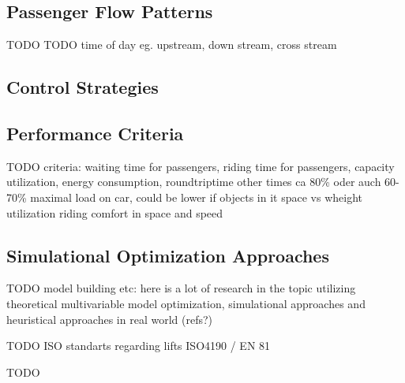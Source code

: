 \subsection{Passenger Flow Patterns}
TODO
TODO time of day eg. upstream, down stream, cross stream

\subsection{Control Strategies}

\subsection{Performance Criteria}
TODO
criteria: waiting time for passengers, riding time for passengers, capacity utilization, energy consumption, roundtriptime other times
ca 80\% oder auch 60-70\% maximal load on car, could be lower if objects in it
space vs wheight utilization
riding comfort in space and speed

\subsection{Simulational Optimization Approaches}
TODO
model building etc: here is a lot of research in the topic utilizing theoretical multivariable model optimization, simulational approaches and heuristical approaches in real world (refs?)

TODO
ISO standarts regarding lifts ISO4190 / EN 81

TODO
